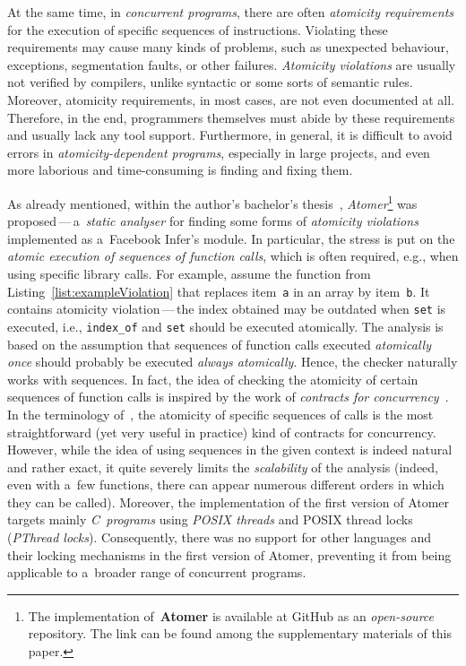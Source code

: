 \documentclass{ExcelAtFIT}
\theoremstyle{definition}
\begin{document}
At the same time, in \emph{concurrent programs}, there are often \emph{atomicity requirements} for the execution of specific sequences of instructions. Violating these requirements may cause many kinds of problems, such as unexpected behaviour, exceptions, segmentation faults, or other failures. \emph{Atomicity violations} are usually not verified by compilers, unlike syntactic or some sorts of semantic rules. Moreover, atomicity requirements, in most cases, are not even documented at all. Therefore, in the end, programmers themselves must abide by these requirements and usually lack any tool support. Furthermore, in general, it is difficult to avoid errors in \emph{atomicity-dependent programs}, especially in large projects, and even more laborious and time-consuming is finding and fixing them.

As already mentioned, within the author's bachelor's thesis~\cite{harmimBP}, \emph{Atomer}\footnote{The implementation of~\textbf{Atomer} is available at GitHub as an \emph{open-source} repository. The link can be found among the supplementary materials of this paper.} was proposed\,---\,a~\emph{static analyser} for finding some forms of \emph{atomicity violations} implemented as a~Facebook Infer's module. In particular, the stress is put on the \emph{atomic execution of sequences of function calls}, which is often required, e.g., when using specific library calls. For example, assume the function from Listing~\ref{list:exampleViolation} that replaces item~\texttt{a} in an array by item~\texttt{b}. It contains atomicity violation\,---\,the index obtained may be outdated when \texttt{set} is executed, i.e., \texttt{index\_of} and \texttt{set} should be executed atomically. The analysis is based on the assumption that sequences of function calls executed \emph{atomically once} should probably be executed \emph{always atomically}. Hence, the checker naturally works with sequences. In fact, the idea of checking the atomicity of certain sequences of function calls is inspired by the work of \emph{contracts for concurrency}~\cite{contracts2017}. In the terminology of~\cite{contracts2017}, the atomicity of specific sequences of calls is the most straightforward (yet very useful in practice) kind of contracts for concurrency. However, while the idea of using sequences in the given context is indeed natural and rather exact, it quite severely limits the \emph{scalability} of the analysis (indeed, even with a~few functions, there can appear numerous different orders in which they can be called). Moreover, the implementation of the first version of Atomer targets mainly \emph{C~programs} using \emph{POSIX threads} and POSIX thread locks (\emph{PThread locks}). Consequently, there was no support for other languages and their locking mechanisms in the first version of Atomer, preventing it from being applicable to a~broader range of concurrent programs.
\end{document}
